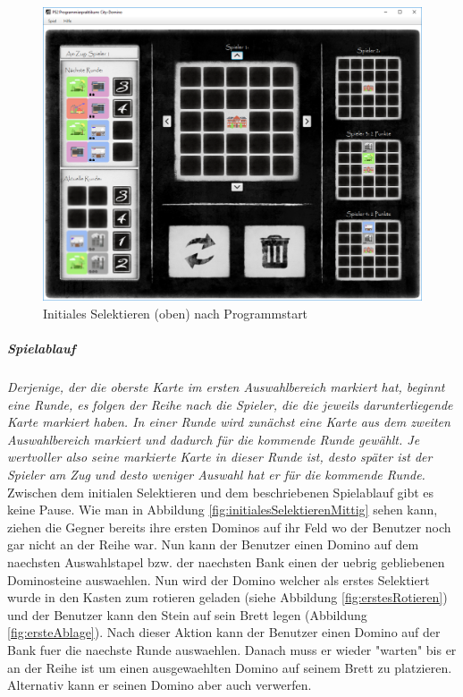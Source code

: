 \begin{figure}
	\centering
	\includegraphics{screenshots/screenshot_InitialesSelektieren2.png}
	\caption[Initiales Selektieren - oben]{Initiales Selektieren (oben) nach Programmstart}
	\label{fig:initialesSelektierenOben}
\end{figure}

\subparagraph{Spielablauf}
\emph{Derjenige, der die oberste Karte im ersten Auswahlbereich markiert hat, beginnt eine Runde, es folgen der Reihe
nach die Spieler, die die jeweils darunterliegende Karte markiert haben. In einer Runde wird zunächst eine Karte
aus dem zweiten Auswahlbereich markiert und dadurch für die kommende Runde gewählt. Je wertvoller also seine
markierte Karte in dieser Runde ist, desto später ist der Spieler am Zug und desto weniger Auswahl hat er für die
kommende Runde.}
\cite{aufgabenstellung}
Zwischen dem initialen Selektieren und dem beschriebenen Spielablauf gibt es keine Pause. Wie man in Abbildung \ref{fig:initialesSelektierenMittig} sehen kann, ziehen die Gegner bereits ihre ersten Dominos auf ihr Feld wo der Benutzer noch gar nicht an der Reihe war. Nun kann der Benutzer einen Domino auf dem naechsten Auswahlstapel bzw. der naechsten Bank einen der uebrig gebliebenen Dominosteine auswaehlen. Nun wird der Domino welcher als erstes Selektiert wurde in den Kasten zum rotieren geladen (siehe Abbildung \ref{fig:erstesRotieren}) und der Benutzer kann den Stein auf sein Brett legen (Abbildung \ref{fig:ersteAblage}). Nach dieser Aktion kann der Benutzer einen Domino auf der Bank fuer die naechste Runde auswaehlen. Danach muss er wieder "warten" bis er an der Reihe ist um einen ausgewaehlten Domino auf seinem Brett zu platzieren. Alternativ kann er seinen Domino aber auch verwerfen.

